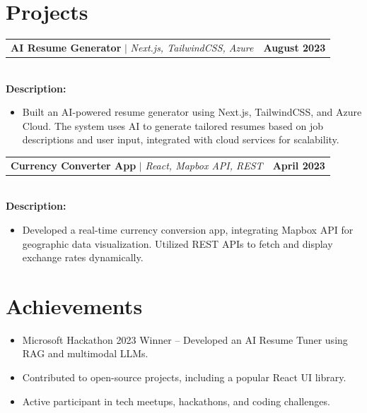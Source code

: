 \documentclass[letterpaper,11pt]{article}
\makeatletter
\newcommand{\resumeItem}[1]{
  \item\small{
    {#1 \vspace{-2pt}}
  }
}
\newcommand{\resumeProjectHeading}[2]{
    \item
    \begin{tabular*}{1.001\textwidth}{l@{\extracolsep{\fill}}r}
      \small#1 & \textbf{\small #2}\\
    \end{tabular*}\vspace{-7pt}
}
\newcommand{\resumeItemListStart}{\begin{itemize}}
\newcommand{\resumeItemListEnd}{\end{itemize}\vspace{-5pt}}
\makeatother
\begin{document}
\section{Projects}

\resumeProjectHeading
{\textbf{AI Resume Generator} $|$ \emph{Next.js, TailwindCSS, Azure}}{August 2023}\\
\vspace{6pt}
\textbf{Description:}
\vspace{-5pt}
\resumeItemListStart
\resumeItem{Built an AI-powered resume generator using Next.js, TailwindCSS, and Azure Cloud. The system uses AI to generate tailored resumes based on job descriptions and user input, integrated with cloud services for scalability.}
\resumeItemListEnd

\resumeProjectHeading
{\textbf{Currency Converter App} $|$ \emph{React, Mapbox API, REST}}{April 2023}\\
\vspace{6pt}
\textbf{Description:}
\vspace{-5pt}
\resumeItemListStart
\resumeItem{Developed a real-time currency conversion app, integrating Mapbox API for geographic data visualization. Utilized REST APIs to fetch and display exchange rates dynamically.}
\resumeItemListEnd

\section{Achievements}
\begin{itemize}
\item Microsoft Hackathon 2023 Winner – Developed an AI Resume Tuner using RAG and multimodal LLMs.
\item Contributed to open-source projects, including a popular React UI library.
\item Active participant in tech meetups, hackathons, and coding challenges.
\end{itemize}

\vspace{10pt}
\end{document}
